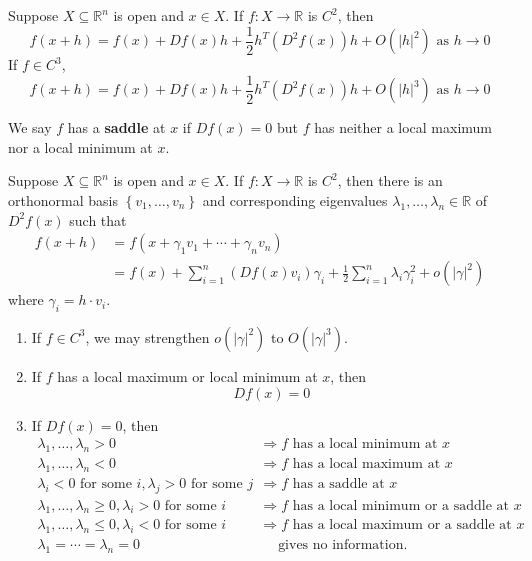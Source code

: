 \documentclass[11pt]{elegantbook}
\begin{document}
\begin{theorem}
    Suppose $X \subseteq \mathbb{R}^n$ is open and $x \in X$. If $f: X \rightarrow \mathbb{R}$ is $C^2$, then
    $$
    f(x+h)=f(x)+D f(x) h +\frac{1}{2}h^T(D^2f(x))h+O\left(|h|^2\right) \text { as } h \rightarrow 0
    $$
    If $f\in C^3$,
    $$
    f(x+h)=f(x)+D f(x) h +\frac{1}{2}h^T(D^2f(x))h+O\left(|h|^3\right) \text { as } h \rightarrow 0
    $$
\end{theorem}

\begin{definition}
    \normalfont
    We say $f$ has a \textbf{saddle} at $x$ if $D f(x)=0$ but $f$ has neither a local maximum nor a local minimum at $x$.
\end{definition}

\begin{corollary}
    Suppose $X \subseteq \mathbb{R}^n$ is open and $x \in X$. If $f: X \rightarrow \mathbb{R}$ is $C^2$, then there is an orthonormal basis $\left\{v_1, \ldots, v_n\right\}$ and corresponding eigenvalues $\lambda_1, \ldots, \lambda_n \in \mathbb{R}$ of $D^2 f(x)$ such that
    $$
    \begin{aligned}
    f(x+h) & =f\left(x+\gamma_1 v_1+\cdots+\gamma_n v_n\right) \\
    & =f(x)+\sum_{i=1}^n\left(D f(x) v_i\right) \gamma_i+\frac{1}{2} \sum_{i=1}^n \lambda_i \gamma_i^2+o\left(|\gamma|^2\right)
    \end{aligned}
    $$
    where $\gamma_i=h \cdot v_i$.
    \begin{enumerate}[1.]
        \item If $f \in C^3$, we may strengthen $o\left(|\gamma|^2\right)$ to $O\left(|\gamma|^3\right)$.
        \item If $f$ has a local maximum or local minimum at $x$, then
        $$
        D f(x)=0
        $$
        \item If $D f(x)=0$, then
        $$
        \begin{array}{rl}
        \lambda_1, \ldots, \lambda_n>0 & \Rightarrow f \text { has a local minimum at } x \\
        \lambda_1, \ldots, \lambda_n<0 & \Rightarrow f \text { has a local maximum at } x \\
        \lambda_i<0 \text { for some } i, \lambda_j>0 \text { for some } j & \Rightarrow f \text { has a saddle at } x \\
        \lambda_1, \ldots, \lambda_n \geq 0, \lambda_i>0 \text { for some } i &\Rightarrow f \text { has a local minimum or a saddle at } x \\
        \lambda_1, \ldots, \lambda_n \leq 0, \lambda_i<0 \text { for some } i &\Rightarrow f \text { has a local maximum or a saddle at } x \\
        \lambda_1=\cdots=\lambda_n=0 &\quad \text{ gives no information. }
        \end{array}
        $$
    \end{enumerate}
\end{corollary}
\end{document}
